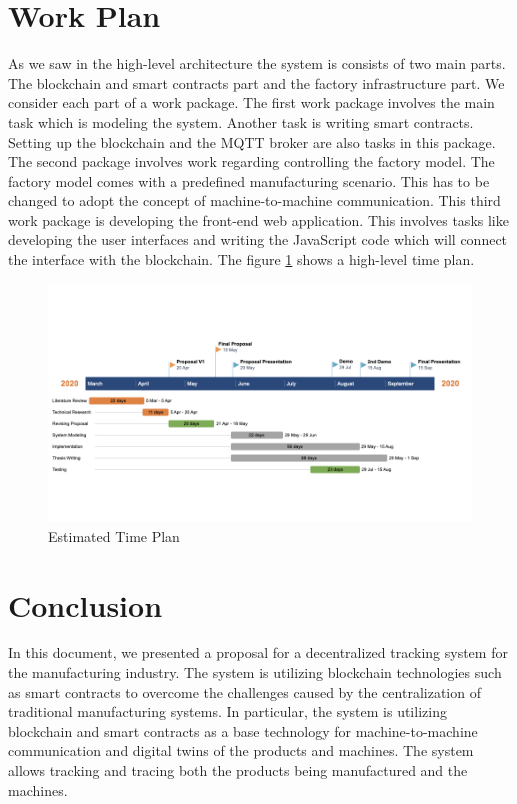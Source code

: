 \documentclass[runningheads]{llncs}
\begin{document}
\section{Work Plan}
As we saw in the high-level architecture the system is consists of two main parts. The blockchain and smart contracts part and the factory infrastructure part. We consider each part of a work package. The first work package involves the main task which is modeling the system. Another task is writing smart contracts. Setting up the blockchain and the MQTT broker are also tasks in this package. The second package involves work regarding controlling the factory model. The factory model comes with a predefined manufacturing scenario. This has to be changed to adopt the concept of machine-to-machine communication. This third work package is developing the front-end web application. This involves tasks like developing the user interfaces and writing the JavaScript code which will connect the interface with the blockchain. \noindent The figure \ref{fig:time_plan} shows a high-level time plan.



\begin{figure}
\centering
\includegraphics[width=1\textwidth]{figures/time_plan.jpeg}
\caption{Estimated Time Plan}
\label{fig:time_plan}
\end{figure}




\section{Conclusion}
In this document, we presented a proposal for a decentralized tracking system for the manufacturing industry. The system is utilizing blockchain technologies such as smart contracts to overcome the challenges caused by the centralization of traditional manufacturing systems. In particular, the system is utilizing blockchain and smart contracts as a base technology for machine-to-machine communication and digital twins of the products and machines. The system allows tracking and tracing both the products being manufactured and the machines. 

\newpage


\end{document}
